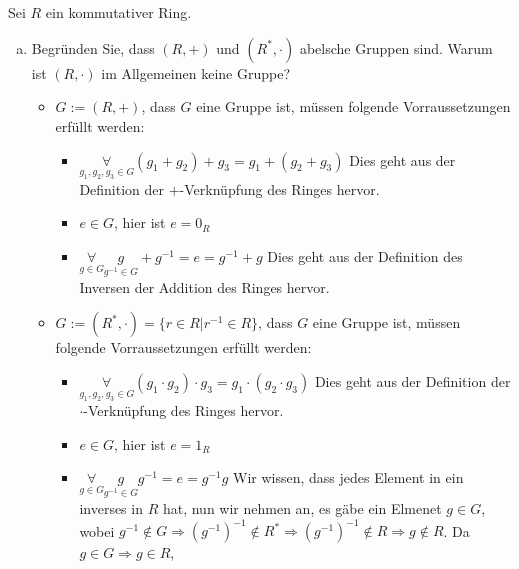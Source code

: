 \documentclass{article}
\begin{document}
\section{}
\subsection{}
\color{blue}
Sei $R$ ein kommutativer Ring.
\color{black}
\begin{enumerate}[(a)]
    \item
        \color{blue}
        Begründen Sie, dass $(R,+)$ und $(R^*,\cdot)$ abelsche Gruppen sind.
        Warum ist $(R,\cdot)$ im Allgemeinen keine Gruppe?
        \color{black}
        \begin{itemize}
            \item $G:=(R,+)$, dass $G$ eine Gruppe ist, müssen folgende Vorraussetzungen erfüllt werden:
                \begin{itemize}
                    \item $\underset{g_1,g_2,g_3\in G}\forall(g_1+g_2)+g_3=g_1+(g_2+g_3)$
                        Dies geht aus der Definition der $+$-Verknüpfung des Ringes hervor.
                    \item $e\in G$, hier ist $e=0_R$
                    \item $\underset{g\in G}\forall\underset{g^{-1}\in G}g+g^{-1}=e=g^{-1}+g$
                        Dies geht aus der Definition des Inversen der Addition des Ringes hervor.
                \end{itemize}
            \item $G:=(R^*,\cdot)=\{r\in R|r^{-1}\in R\}$, dass $G$ eine Gruppe ist,
                müssen folgende Vorraussetzungen erfüllt werden:
                \begin{itemize}
                    \item $\underset{g_1,g_2,g_3\in G}\forall(g_1\cdot g_2)\cdot g_3=g_1\cdot (g_2\cdot g_3)$
                        Dies geht aus der Definition der $\cdot$-Verknüpfung des Ringes hervor.
                    \item $e\in G$, hier ist $e=1_R$
                    \item $\underset{g\in G}\forall\underset{g^{-1}\in G}gg^{-1}=e=g^{-1}g$
                        Wir wissen, dass jedes Element in ein inverses in $R$ hat,
                        nun wir nehmen an, es gäbe ein Elmenet $g\in G$, wobei $g^{-1}\notin G\Rightarrow (g^{-1})^{-1}\notin
                        R^*\Rightarrow (g^{-1})^{-1}\notin R\Rightarrow g\notin R$. Da $g\in G\Rightarrow g\in R$,

\end{itemize}
\end{itemize}
\end{enumerate}
\end{document}
